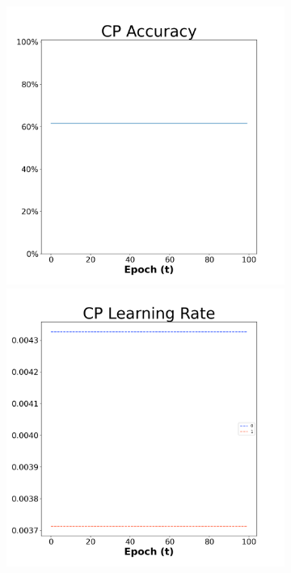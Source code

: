 \begin{figure}[H]
  \centering %
\begin{subfigure}{0.3\textwidth}
\includegraphics[width=\linewidth]{images/exper1/SP/CP_0.01_acc.png}
  \includegraphics[width=\linewidth]{images/exper1/SP/CP_0.01_lr.png}

\end{subfigure}
\end{figure}
